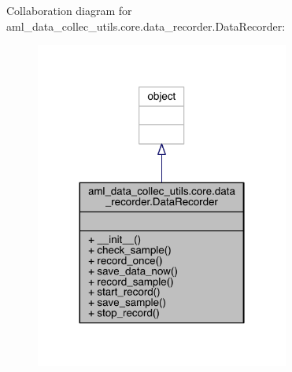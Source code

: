 Collaboration diagram for aml\+\_\+data\+\_\+collec\+\_\+utils.\+core.\+data\+\_\+recorder.\+Data\+Recorder\+:
\nopagebreak
\begin{figure}[H]
\begin{center}
\leavevmode
\includegraphics[width=236pt]{classaml__data__collec__utils_1_1core_1_1data__recorder_1_1_data_recorder__coll__graph}
\end{center}
\end{figure}
